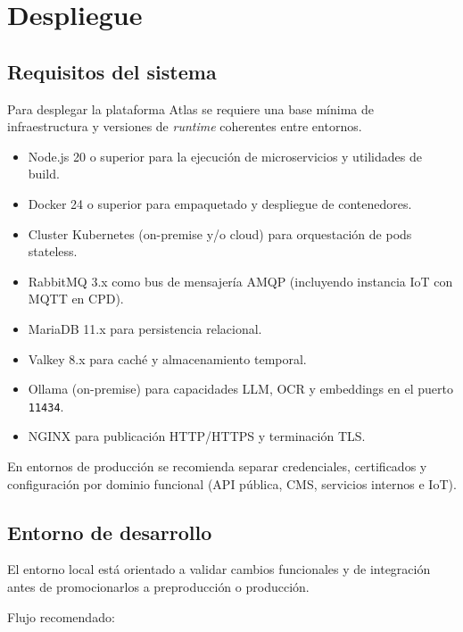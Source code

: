 \chapter{Despliegue}
\label{cap:despliegue}

\section{Requisitos del sistema}

Para desplegar la plataforma Atlas se requiere una base mínima de infraestructura y versiones de \textit{runtime} coherentes entre entornos.

\begin{itemize}
\item Node.js 20 o superior para la ejecución de microservicios y utilidades de build.
\item Docker 24 o superior para empaquetado y despliegue de contenedores.
\item Cluster Kubernetes (on-premise y/o cloud) para orquestación de pods stateless.
\item RabbitMQ 3.x como bus de mensajería AMQP (incluyendo instancia IoT con MQTT en CPD).
\item MariaDB 11.x para persistencia relacional.
\item Valkey 8.x para caché y almacenamiento temporal.
\item Ollama (on-premise) para capacidades LLM, OCR y embeddings en el puerto \texttt{11434}.
\item NGINX para publicación HTTP/HTTPS y terminación TLS.
\end{itemize}

En entornos de producción se recomienda separar credenciales, certificados y configuración por dominio funcional (API pública, CMS, servicios internos e IoT).

\section{Entorno de desarrollo}

El entorno local está orientado a validar cambios funcionales y de integración antes de promocionarlos a preproducción o producción.

Flujo recomendado:

